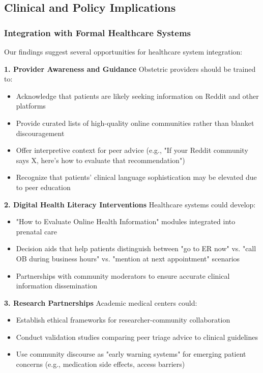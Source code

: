 \documentclass[12pt, a4paper]{article}
\begin{document}
\subsection{Clinical and Policy Implications}

\subsubsection{Integration with Formal Healthcare Systems}
Our findings suggest several opportunities for healthcare system integration:

\textbf{1. Provider Awareness and Guidance}
Obstetric providers should be trained to:
\begin{itemize}
    \item Acknowledge that patients are likely seeking information on Reddit and other platforms
    \item Provide curated lists of high-quality online communities rather than blanket discouragement
    \item Offer interpretive context for peer advice (e.g., "If your Reddit community says X, here's how to evaluate that recommendation")
    \item Recognize that patients' clinical language sophistication may be elevated due to peer education
\end{itemize}

\textbf{2. Digital Health Literacy Interventions}
Healthcare systems could develop:
\begin{itemize}
    \item "How to Evaluate Online Health Information" modules integrated into prenatal care
    \item Decision aids that help patients distinguish between "go to ER now" vs. "call OB during business hours" vs. "mention at next appointment" scenarios
    \item Partnerships with community moderators to ensure accurate clinical information dissemination
\end{itemize}

\textbf{3. Research Partnerships}
Academic medical centers could:
\begin{itemize}
    \item Establish ethical frameworks for researcher-community collaboration
    \item Conduct validation studies comparing peer triage advice to clinical guidelines
    \item Use community discourse as "early warning systems" for emerging patient concerns (e.g., medication side effects, access barriers)
\end{itemize}
\end{document}
